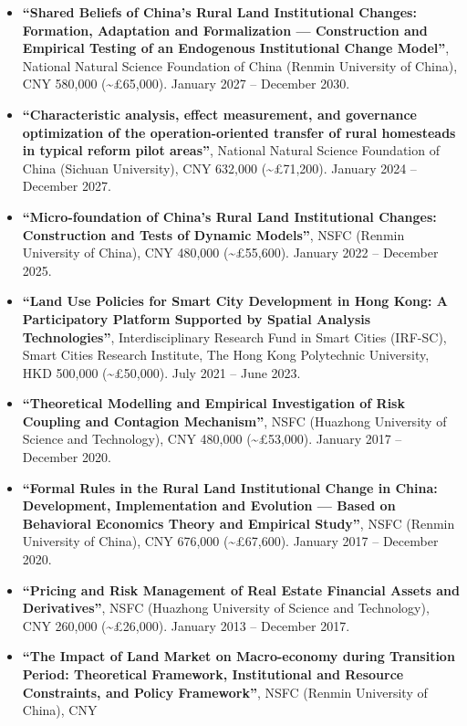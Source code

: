 \documentclass[11pt,a4paper]{article}
\providecommand{\tightlist}{%
  \setlength{\itemsep}{1pt}\setlength{\parskip}{0pt}}
\begin{document}
\begin{itemize}
\tightlist
\item
  \textbf{``Shared Beliefs of China's Rural Land Institutional Changes:
  Formation, Adaptation and Formalization --- Construction and Empirical
  Testing of an Endogenous Institutional Change Model''}, National
  Natural Science Foundation of China (Renmin University of China), CNY
  580,000 (\textasciitilde£65,000). January 2027 -- December 2030.
\item
  \textbf{``Characteristic analysis, effect measurement, and governance
  optimization of the operation-oriented transfer of rural homesteads in
  typical reform pilot areas''}, National Natural Science Foundation of
  China (Sichuan University), CNY 632,000 (\textasciitilde£71,200).
  January 2024 -- December 2027.
\item
  \textbf{``Micro-foundation of China's Rural Land Institutional
  Changes: Construction and Tests of Dynamic Models''}, NSFC (Renmin
  University of China), CNY 480,000 (\textasciitilde£55,600). January
  2022 -- December 2025.
\item
  \textbf{``Land Use Policies for Smart City Development in Hong Kong: A
  Participatory Platform Supported by Spatial Analysis Technologies''},
  Interdisciplinary Research Fund in Smart Cities (IRF-SC), Smart Cities
  Research Institute, The Hong Kong Polytechnic University, HKD 500,000
  (\textasciitilde£50,000). July 2021 -- June 2023.
\item
  \textbf{``Theoretical Modelling and Empirical Investigation of Risk
  Coupling and Contagion Mechanism''}, NSFC (Huazhong University of
  Science and Technology), CNY 480,000 (\textasciitilde£53,000). January
  2017 -- December 2020.
\item
  \textbf{``Formal Rules in the Rural Land Institutional Change in
  China: Development, Implementation and Evolution --- Based on
  Behavioral Economics Theory and Empirical Study''}, NSFC (Renmin
  University of China), CNY 676,000 (\textasciitilde£67,600). January
  2017 -- December 2020.
\item
  \textbf{``Pricing and Risk Management of Real Estate Financial Assets
  and Derivatives''}, NSFC (Huazhong University of Science and
  Technology), CNY 260,000 (\textasciitilde£26,000). January 2013 --
  December 2017.
\item
  \textbf{``The Impact of Land Market on Macro-economy during Transition
  Period: Theoretical Framework, Institutional and Resource Constraints,
  and Policy Framework''}, NSFC (Renmin University of China), CNY

\end{itemize}
\end{document}
